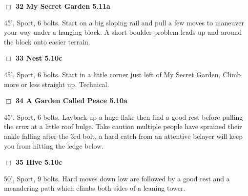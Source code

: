 \begin{multicols}{2}
\needspace{2em}
\label{rt:My Secret Garden}
\colorbox{RoyalBlue!20}{
\parbox{0.95\linewidth}{
\hspace{-1ex}\textbf{$\Box$
32 My Secret Garden 5.11a  
}}}
\begin{adjustwidth}{1.3em}{}			

45', Sport, 6 bolts. Start on a big sloping rail and pull a few moves to maneuver your way under a hanging block. A short boulder problem leads up and around the block onto easier terrain.
\end{adjustwidth}




\needspace{2em}
\label{rt:Nest}
\colorbox{RoyalBlue!20}{
\parbox{0.95\linewidth}{
\hspace{-1ex}\textbf{$\Box$
33 Nest 5.10c  
}}}
\begin{adjustwidth}{1.3em}{}			

45', Sport, 6 bolts. Start in a little corner just left of My Secret Garden, Climb more or less straight up. Technical.
\end{adjustwidth}




\needspace{2em}
\label{rt:A Garden Called Peace}
\colorbox{RoyalBlue!20}{
\parbox{0.95\linewidth}{
\hspace{-1ex}\textbf{$\Box$
34 A Garden Called Peace 5.10a  
}}}
\begin{adjustwidth}{1.3em}{}			

45', Sport, 6 bolts. Layback up a huge flake then find a good rest before pulling the crux at a little roof bulge. Take caution multiple people have sprained their ankle falling after the 3rd bolt, a hard catch from an attentive belayer will keep you from hitting the ledge below.
\end{adjustwidth}




\needspace{2em}
\label{rt:Hive}
\colorbox{RoyalBlue!20}{
\parbox{0.95\linewidth}{
\hspace{-1ex}\textbf{$\Box$
35 Hive 5.10c  
}}}
\begin{adjustwidth}{1.3em}{}			

50', Sport, 9 bolts. Hard moves down low are followed by a good rest and a meandering path which climbs both sides of a leaning tower.
\end{adjustwidth}




	\end{multicols}


